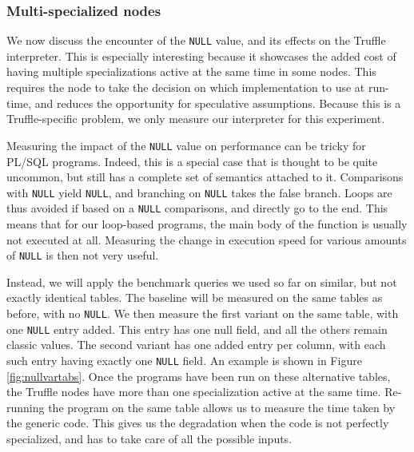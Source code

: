 \documentclass[twoside,11pt,a4paper]{article}
\newcommand{\pls}[1]{\small\texttt{#1}\normalsize}
\newcommand{\plsnull}{\pls{NULL}}
\begin{document}
\subsubsection{Multi-specialized nodes}

We now discuss the encounter of the \plsnull{} value, and its effects on the Truffle interpreter. This is especially interesting because it showcases the added cost of having multiple specializations active at the same time in some nodes. This requires the node to take the decision on which implementation to use at run-time, and reduces the opportunity for speculative assumptions. Because this is a Truffle-specific problem, we only measure our interpreter for this experiment.

Measuring the impact of the \plsnull{} value on performance can be tricky for PL/SQL programs. Indeed, this is a special case that is thought to be quite uncommon, but still has a complete set of semantics attached to it. Comparisons with \plsnull{} yield \plsnull{}, and branching on \plsnull{} takes the false branch. Loops are thus avoided if based on a \plsnull{} comparisons, and directly go to the end. This means that for our loop-based programs, the main body of the function is usually not executed at all. Measuring the change in execution speed for various amounts of \plsnull{} is then not very useful.

Instead, we will apply the benchmark queries we used so far on similar, but not exactly identical tables. The baseline will be measured on the same tables as before, with no \plsnull{}. We then measure the first variant on the same table, with one \plsnull{} entry added. This entry has one null field, and all the others remain classic values. The second variant has one added entry per column, with each such entry having exactly one \plsnull{} field. An example is shown in Figure \ref{fig:nullvartabs}. Once the programs have been run on these alternative tables, the Truffle nodes have more than one specialization active at the same time. Re-running the program on the same table allows us to measure the time taken by the generic code. This gives us the degradation when the code is not perfectly specialized, and has to take care of all the possible inputs.
\end{document}
